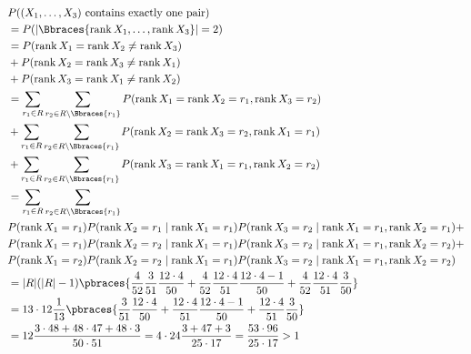 \begin{solution}
\begin{enumerate}[label = (\alph*)]
    \begin{align*}
        &
        P((X_1, \dots, X_3) ~\text{contains exactly one pair}) \\
        & =
        P(|\Bbraces{\operatorname{rank} X_1, \dots, \operatorname{rank} X_3}| = 2) \\
        & =
        P(\operatorname{rank} X_1 = \operatorname{rank} X_2 \neq \operatorname{rank} X_3) \\
        & +
        P(\operatorname{rank} X_2 = \operatorname{rank} X_3 \neq \operatorname{rank} X_1) \\
        & +
        P(\operatorname{rank} X_3 = \operatorname{rank} X_1 \neq \operatorname{rank} X_2) \\
        & =
        \sum_{r_1 \in R} \sum_{r_2 \in R \setminus \Bbraces{r_1}}
            P(\operatorname{rank} X_1 = \operatorname{rank} X_2 = r_1, \operatorname{rank} X_3 = r_2) \\
        & +
        \sum_{r_1 \in R} \sum_{r_2 \in R \setminus \Bbraces{r_1}}
            P(\operatorname{rank} X_2 = \operatorname{rank} X_3 = r_2, \operatorname{rank} X_1 = r_1) \\
        & +
        \sum_{r_1 \in R} \sum_{r_2 \in R \setminus \Bbraces{r_1}}
            P(\operatorname{rank} X_3 = \operatorname{rank} X_1 = r_1, \operatorname{rank} X_2 = r_2) \\
        & =
        \sum_{r_1 \in R} \sum_{r_2 \in R \setminus \Bbraces{r_1}} \\
            & P(\operatorname{rank} X_1 = r_1) P(\operatorname{rank} X_2 = r_1 \mid \operatorname{rank} X_1 = r_1) P(\operatorname{rank} X_3 = r_2 \mid \operatorname{rank} X_1 = r_1, \operatorname{rank} X_2 = r_1)
            + \\
            & P(\operatorname{rank} X_1 = r_1) P(\operatorname{rank} X_2 = r_2 \mid \operatorname{rank} X_1 = r_1) P(\operatorname{rank} X_3 = r_2 \mid \operatorname{rank} X_1 = r_1, \operatorname{rank} X_2 = r_2)
            + \\
            & P(\operatorname{rank} X_1 = r_2) P(\operatorname{rank} X_2 = r_2 \mid \operatorname{rank} X_1 = r_1) P(\operatorname{rank} X_3 = r_2 \mid \operatorname{rank} X_1 = r_1, \operatorname{rank} X_2 = r_2) \\
        & =
        |R| (|R| - 1)
        \pbraces
        {
            \frac{4}{52} \frac{3}{51} \frac{12 \cdot 4}{50}
            +
            \frac{4}{52} \frac{12 \cdot 4}{51} \frac{12 \cdot 4 - 1}{50}
            +
            \frac{4}{52} \frac{12 \cdot 4}{51} \frac{3}{50}
        } \\
    	& =
    	13 \cdot 12 \frac{1}{13} 
    	\pbraces
    	{
    		\frac{3}{51} \frac{12 \cdot 4}{50}
    		+
    		\frac{12 \cdot 4}{51} \frac{12 \cdot 4 - 1}{50}
    		+
    		\frac{12 \cdot 4}{51} \frac{3}{50}
    	} \\
    	& = 12 \frac{3 \cdot 48 + 48 \cdot 47 + 48 \cdot 3 }{50 \cdot 51} = 4 \cdot 24 \frac{3 + 47 + 3}{25 \cdot 17} = \frac{53 \cdot 96}{25 \cdot 17} > 1
    \end{align*}


\end{enumerate}
\end{solution}
